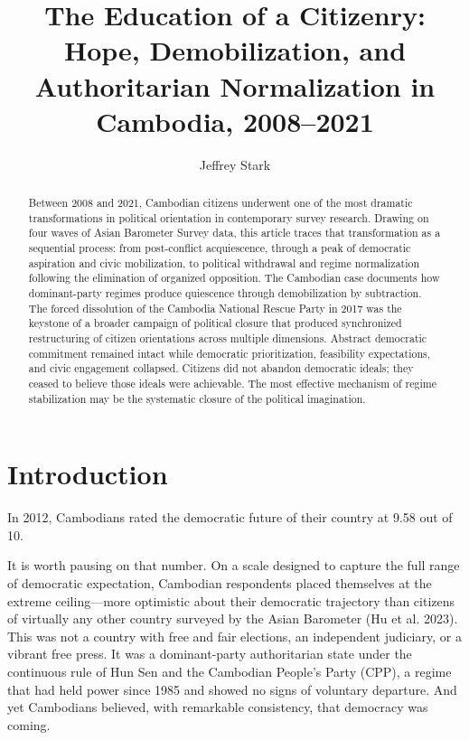 \documentclass[Review,times,sageh,doublespace]{sagej}
\title{The Education of a Citizenry: Hope, Demobilization, and Authoritarian Normalization in Cambodia, 2008--2021}
\author{Jeffrey Stark\affilnum{1}}
\affiliation{\affilnum{1}Department of Sociology, Yonsei University, Seoul, South Korea}
\begin{document}
\makeatletter\let\NAT@parse\@gobble\makeatother  %
\def\journalname{Comparative Political Studies}
\maketitle
\begin{abstract}
Between 2008 and 2021, Cambodian citizens underwent one of the most
dramatic transformations in political orientation in contemporary survey
research. Drawing on four waves of Asian Barometer Survey data, this
article traces that transformation as a sequential process: from
post-conflict acquiescence, through a peak of democratic aspiration and
civic mobilization, to political withdrawal and regime normalization
following the elimination of organized opposition. The Cambodian case
documents how dominant-party regimes produce quiescence through
demobilization by subtraction. The forced dissolution of the Cambodia
National Rescue Party in 2017 was the keystone of a broader campaign of
political closure that produced synchronized restructuring of citizen
orientations across multiple dimensions. Abstract democratic commitment
remained intact while democratic prioritization, feasibility
expectations, and civic engagement collapsed. Citizens did not abandon
democratic ideals; they ceased to believe those ideals were achievable.
The most effective mechanism of regime stabilization may be the
systematic closure of the political imagination.
\end{abstract}



\section{Introduction}\label{introduction}

In 2012, Cambodians rated the democratic future of their country at 9.58
out of 10.

It is worth pausing on that number. On a scale designed to capture the
full range of democratic expectation, Cambodian respondents placed
themselves at the extreme ceiling---more optimistic about their
democratic trajectory than citizens of virtually any other country
surveyed by the Asian Barometer (Hu et al. 2023). This was not a country
with free and fair elections, an independent judiciary, or a vibrant
free press. It was a dominant-party authoritarian state under the
continuous rule of Hun Sen and the Cambodian People's Party (CPP), a
regime that had held power since 1985 and showed no signs of voluntary
departure. And yet Cambodians believed, with remarkable consistency,
that democracy was coming.
\end{document}
